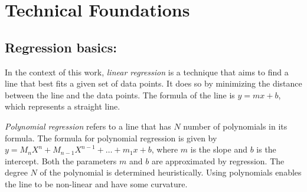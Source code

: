 \section{Technical Foundations}

\subsection{Regression basics:}

 In the context of this work, \textit{linear regression} is a technique that aims to find a line that best fits a given set of data points. It does so by minimizing the distance between the line and the data points. The formula of the line is $y = mx + b$, which represents a straight line.

\textit{Polynomial regression} refers to a line that has $N$ number of polynomials in its formula. The formula for polynomial regression is given by $y = M_{n}X^{n} + M_{n-1}X^{n-1} + \ldots + m_{1}x + b$, where $m$ is the slope and $b$ is the intercept. Both the parameters $m$ and $b$ are approximated by regression. The degree $N$ of the polynomial is determined heuristically. Using polynomials enables the line to be non-linear and have some curvature.
